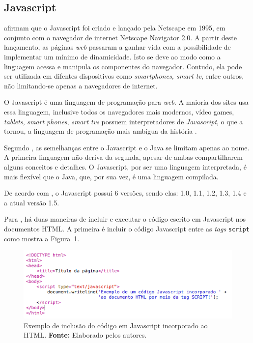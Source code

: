 \subsection{Javascript}

 afirmam que o Javascript foi criado e lançado pela Netscape em 1995, em conjunto com o navegador de internet Netscape Navigator 2.0. A partir deste lançamento, as páginas \textit{web} passaram a ganhar vida com a possibilidade de implementar um mínimo de dinamicidade. Isto se deve ao modo como a linguagem acessa e manipula os componentes do navegador. Contudo, ela pode ser utilizada em difentes dispositivos como \textit{smartphones, smart tv}, entre outros, não limitando-se apenas a navegadores de internet.

O Javascript é uma linguagem de programação para \textit{web}. A maioria dos sites usa essa linguagem, inclusive todos os navegadores mais modernos, vídeo games, \textit{tablets}, \textit{smart phones}, \textit{smart tvs} possuem interpretadores de \textit{Javascript}, o que a tornou, a linguagem de programação mais ambígua da história \cite{flanagan_javascript_definitive_guide}.

Segundo , as semelhanças entre o Javascript e o Java se limitam apenas ao nome. A primeira linguagem não deriva da segunda, apesar de ambas compartilharem alguns conceitos e detalhes. O Javascript, por ser uma linguagem interpretada, é mais flexível que o Java, que, por sua vez, é uma linguagem compilada.

De acordo com , o Javascript possui 6 versões, sendo elas: 1.0, 1.1, 1.2, 1.3, 1.4 e a atual versão 1.5.

Para , há duas maneiras de incluir e executar o código escrito em Javascript nos documentos HTML. A primeira é incluir o código Javascript entre as \textit{tags} \texttt{script} como mostra a Figura~\ref{fig:javascript_incorporado}. 

\begin{figure}[h!]
	\centerline{\includegraphics[scale=0.8]{./imagens/javascript_code.png}}
	\caption[Exemplo de inclusão do código em Javascript incorporado ao HTML]
	{Exemplo de inclusão do código em Javascript incorporado ao HTML. \textbf{Fonte:} Elaborado pelos autores.}
	\label{fig:javascript_incorporado}
\end{figure}

